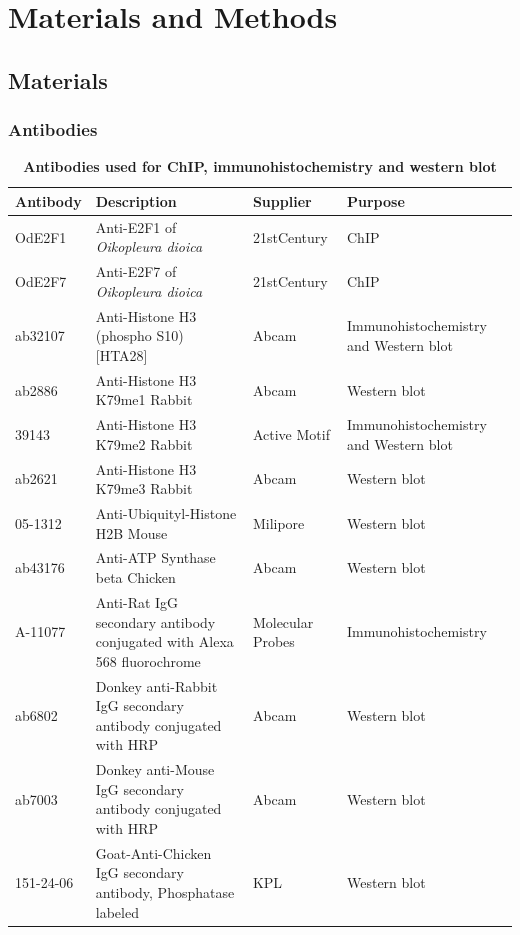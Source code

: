 \documentclass[11pt,twoside,a4paper]{report}
\begin{document}
\clearpage

\chapter{Materials and Methods}
	\section{Materials}
		\subsection{Antibodies}
			\begin{table}[H]
       		\caption{\bf{Antibodies used for ChIP, immunohistochemistry and western blot}}
        		\begin{center}
            		\begin{tabular}{p{2cm} | p{7cm} | p{2.5cm} | p{3cm}}
	                	\textbf{Antibody} & \textbf{Description} & \textbf{Supplier} & \textbf{Purpose}\\
    		            \hline
            		    OdE2F1 & Anti-E2F1 of \textit{Oikopleura dioica} & 21stCentury & ChIP\\
						OdE2F7 & Anti-E2F7 of \textit{Oikopleura dioica} & 21stCentury & ChIP\\
            		    ab32107 & Anti-Histone H3 (phospho S10) [HTA28] & Abcam & Immunohistochemistry and Western blot\\
            		    ab2886 & Anti-Histone H3 K79me1 Rabbit & Abcam & Western blot\\
            		    39143  & Anti-Histone H3 K79me2 Rabbit & Active Motif & Immunohistochemistry and Western blot\\
            		    ab2621 & Anti-Histone H3 K79me3 Rabbit & Abcam & Western blot\\
            		    05-1312  &  Anti-Ubiquityl-Histone H2B Mouse & Milipore & Western blot\\
            		    ab43176 & Anti-ATP Synthase beta Chicken & Abcam & Western blot\\
            		    \hline
            		    A-11077 & Anti-Rat IgG secondary antibody conjugated with Alexa 568 fluorochrome & Molecular Probes & Immunohistochemistry\\
            		    ab6802 & Donkey anti-Rabbit IgG secondary antibody conjugated with HRP & Abcam & Western blot\\
            		    ab7003 & Donkey anti-Mouse IgG secondary antibody conjugated with HRP & Abcam & Western blot\\
            		    151-24-06 & Goat-Anti-Chicken IgG secondary antibody, Phosphatase labeled & KPL & Western blot\\
	            	\end{tabular}
    		    \end{center}
		    \end{table}
		  
\end{document}
